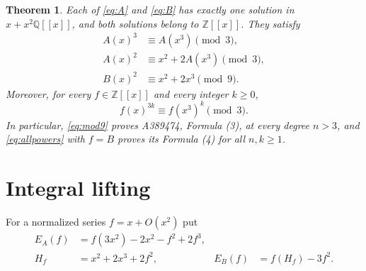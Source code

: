 \documentclass[11pt]{article}
\newtheorem{theorem}{Theorem}
\newcommand{\Z}{\mathbb Z}
\newcommand{\Q}{\mathbb Q}
\begin{document}
\begin{theorem}\label{thm:main}
Each of \eqref{eq:A} and \eqref{eq:B} has exactly one solution in
$x+x^2\Q[[x]]$, and both solutions belong to $\Z[[x]]$.
They satisfy
\begin{align}
 A(x)^3&\equiv A(x^3)\pmod3, \label{eq:4a}\\
 A(x)^2&\equiv x^2+2A(x^3)\pmod3, \label{eq:4b}\\
 B(x)^2&\equiv x^2+2x^3\pmod9. \label{eq:mod9}
\end{align}
Moreover, for every $f\in\Z[[x]]$ and every integer $k\geq0$,
\begin{equation}\label{eq:allpowers}
 f(x)^{3k}\equiv f(x^3)^k\pmod3.
\end{equation}
In particular, \eqref{eq:mod9} proves A389474, Formula (3), at every
degree $n>3$, and \eqref{eq:allpowers} with $f=B$ proves its Formula (4)
for all $n,k\geq1$.
\end{theorem}

\section{Integral lifting}

For a normalized series $f=x+O(x^2)$ put
\begin{align*}
 E_A(f)&=f(3x^2)-2x^2-f^2+2f^3,\\
 H_f&=x^2+2x^3+2f^2, & E_B(f)&=f(H_f)-3f^2.
\end{align*}
\end{document}
